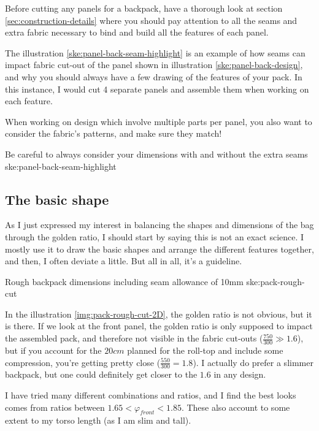 Before cutting any panels for a backpack, have a thorough look at section \ref{sec:construction-details} where you should pay attention to all the seams and extra fabric necessary to bind and build all the features of each panel.

The illustration \ref{ske:panel-back-seam-highlight} is an example of how seams can impact fabric cut-out of the panel shown in illustration \ref{ske:panel-back-design}, and why you should always have a few drawing of the features of your pack. In this instance, I would cut 4 separate panels and assemble them when working on each feature.

\begin{note}
  When working on design which involve multiple parts per panel, you also want to consider the fabric's patterns, and make sure they match!
\end{note}

{Be careful to always consider your dimensions with and without the extra seams}
{ske:panel-back-seam-highlight}

\subsection{The basic shape}

As I just expressed my interest in balancing the shapes and dimensions of the bag through the golden ratio, I should start by saying this is not an exact science. I mostly use it to draw the basic shapes and arrange the different features together, and then, I often deviate a little. But all in all, it's a guideline.

{Rough backpack dimensions including seam allowance of 10mm}
{ske:pack-rough-cut}

In the illustration \ref{img:pack-rough-cut-2D}, the golden ratio is not obvious, but it is there. If we look at the front panel, the golden ratio is only supposed to impact the assembled pack, and therefore not visible in the fabric cut-outs ($\frac{750}{300} \gg 1.6$), but if you account for the $20cm$ planned for the roll-top and include some compression, you're getting pretty close ($\frac{550}{300} = 1.8$). I actually do prefer a slimmer backpack, but one could definitely get closer to the $1.6$ in any design.

I have tried many different combinations and ratios, and I find the best looks comes from ratios between $1.65 < \varphi_{front} < 1.85$. These also account to some extent to my torso length (as I am slim and tall).


